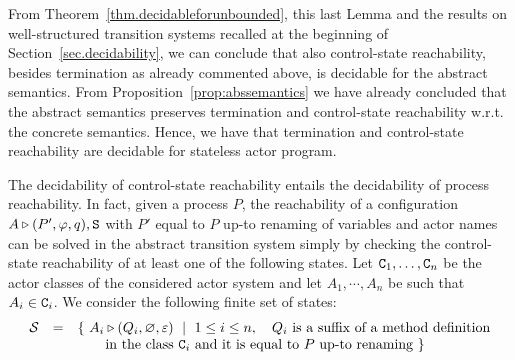 \documentclass{LMCS}
\newcommand{\cal}{\mathcal}
\theoremstyle{plain}\newtheorem{proposition}[thm]{Proposition}
\theoremstyle{plain}\newtheorem{lemma}[thm]{Lemma}
\theoremstyle{plain}\newtheorem{theorem}[thm]{Theorem}
\theoremstyle{plain}\newtheorem{corollary}[thm]{Corollary}
\newif\ifconf \conffalse
\newif\ifcamera \camerafalse
\newcommand{\State}{{\tt S}}
\newcommand{\adef}[1]{{\tt #1}}
\newcommand{\actsl}{${\tt Actor^{\tt sl}}$}
\begin{document}
\ifconf
It turns out that 
control-state reachability
is decidable for the
abstract transition system of {\actsl}.
\else
From Theorem~\ref{thm.decidableforunbounded}, this last Lemma 
and the results on well-structured transition
systems recalled at the beginning of Section~\ref{sec.decidability},
we can conclude that also control-state reachability,
besides termination as already commented above,
is decidable for the abstract semantics. From Proposition~\ref{prop:abssemantics}
we have already concluded that the abstract semantics preserves
termination and control-state reachability w.r.t. the concrete 
semantics. Hence, we have that termination and 
control-state reachability are decidable for
stateless actor program. 
\fi

The decidability of control-state reachability entails the decidability of
process reachability.
In fact,
given a process $P$, 
the reachability of a configuration
$A \triangleright (P', \varphi, q),\State$
with $P'$ equal to $P$ up-to renaming
 of variables and actor names
can be solved in the abstract transition
system simply by checking the control-state
reachability of at least one 
of the following states.
Let ${\adef{C}_1},\ldots,{\adef{C}_n}$
be the actor classes of the considered actor system
and let 
$A_1,\cdots,A_n$ 
be such that $A_i \in {\adef{C}_i}$.
We consider the following finite set of states:
\[
\begin{array}{lll}
{\cal S} & = & \{\ A_i \triangleright (Q_i, \varnothing, \varepsilon)\ \mid \
1 \leq i \leq n,
\quad
\mbox{$Q_i$ is a suffix of a method definition} \\ 
& & \qquad
 \mbox {in the class
${\adef{C}_i}$
and it is
equal to $P$ up-to renaming}
\ \}
\end{array}
\]
\ifcamera
Note that 
control-state reachability 
is not preserved by the abstract semantics.
In fact, the abstract transition system is guaranteed to 
execute the same method invocations, but this can 
be done in a different order and also by different 
actors.
\else

\fi








 
\end{document}
